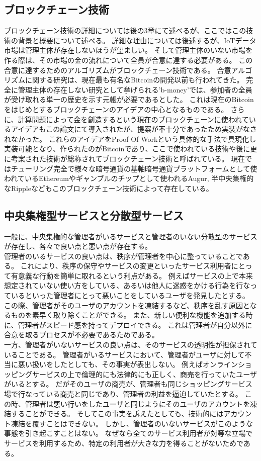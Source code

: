 \subsection{ブロックチェーン技術}
ブロックチェーン技術の詳細については後の3章にて述べるが、ここではこの技術の背景と概要について述べる。
詳細な理由については後述するが、IoTデータ市場は管理主体が存在しないほうが望ましい。
そして管理主体のいない市場を作る際は、その市場の金の流れについて全員が合意に達する必要がある。
この合意に達するためのアルゴリズムがブロックチェーン技術である。
合意アルゴリズムに関する研究は、現在最も有名なBitcoin\cite{Bitcoin}の開発以前も行われてきた。
完全に管理主体の存在しない研究として挙げられる'b-money'\cite{b-money}では、参加者の全員が受け取れる単一の歴史を示す元帳が必要であるとした。
これは現在のBitcoinをはじめとするブロックチェーンのアイデアの中心となるものである。
さらに、計算問題によって金を創造するという現在のブロックチェーンに使われているアイデアもこの論文にて導入されたが、提案が不十分であったため実装がなされなかった。
これらのアイデアをProof Of Workという具体的な手法で具現化し実装可能となり、作られたのがBitcoinであり、ここで使われている技術や後に更に考案された技術が総称されてブロックチェーン技術と呼ばれている。
現在ではチューリング完全で様々な暗号通貨の基軸暗号通貨プラットフォームとして使われているEthereum\cite{ethereum}やギャンブルのチップとして使われるAugur\cite{Augur}, 半中央集権的なRipple\cite{Ripple}などもこのブロックチェーン技術によって存在している。

\subsection{中央集権型サービスと分散型サービス}
一般に、中央集権的な管理者がいるサービスと管理者のいない分散型のサービスが存在し、各々で良い点と悪い点が存在する。 \\
管理者のいるサービスの良い点は、秩序が管理者を中心に整っていることである。
これにより、秩序の保守やサービスの変更といったサービス利用者にとって有意義な行動を簡単に取れるという利点がある。
例えばサービスの上で本来想定されていない使い方をしている、あるいは他人に迷惑をかける行為を行なっているといった管理者にとって悪いことをしているユーザを発見したとする。
この際、管理者がそのユーザのアカウントを凍結するなど、秩序を乱す原因となるものを素早く取り除くことができる。
また、新しい便利な機能を追加する時に、管理者がスピード感を持ってデプロイできる。
これは管理者が自分以外に合意を取るプロセスが不必要であるためである。 \\
一方、管理者がいないサービスの良い点は、そのサービスの透明性が担保されていることである。
管理者がいるサービスにおいて、管理者がユーザに対して不当に悪い扱いをしたとしても、その事実が表出しない。
例えばオンラインショッピングサービスの上で倫理的にも法律的にも正しく、商売を行っていたユーザがいるとする。
だがそのユーザの商売が、管理者も同じショッピングサービス場で行なっている商売と同じであり、管理者の利益を逼迫していたとする。
この時、管理者は悪い行いをしたユーザと同じようにそのユーザのアカウントを凍結することができる。
そしてこの事実を訴えたとしても、技術的にはアカウント凍結を覆すことはできない。
しかし、管理者のいないサービスがこのような事態を引き起こすことはない。
なぜなら全てのサービス利用者が対等な立場でサービスを利用するため、特定の利用者が大きな力を得ることがないためである。

